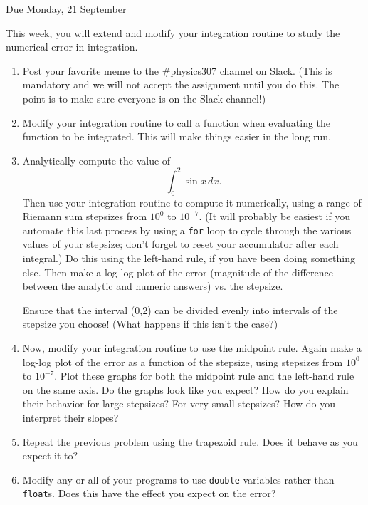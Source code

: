 \documentclass[12pt]{article}
\begin{document}
\Large
\centerline{}
\centerline{Due Monday, 21 September}
\normalsize

This week, you will extend and modify your integration routine to study the numerical error in integration.
\begin{enumerate}

\item Post your favorite meme to the \#physics307 channel on Slack. (This is mandatory and we will not accept the assignment until you do this. The point is to make sure everyone is on the Slack channel!)

\item{Modify your integration routine to call a function when evaluating the function to be integrated. This will make things easier in the long run.}

\item{Analytically compute the value of $$\int_{0}^{2} \sin x\, dx.$$ Then use your integration routine to compute it numerically, using a range of Riemann sum stepsizes from $10^{0}$
    to $10^{-7}$. (It will probably be easiest if you automate this last process by using a {\tt for} loop to cycle through the various values of your stepsize; don't forget to reset your
  accumulator after each integral.) Do this using the left-hand rule, if you have been doing something else. 
  Then make a log-log plot of the error (magnitude of the difference between the analytic and numeric answers) vs. the stepsize.

Ensure that the interval (0,2) can be divided evenly into intervals of the stepsize you choose! (What happens if this isn't the case?)}

\item{Now, modify your integration routine to use the midpoint rule. Again make a log-log plot of the error as a function of the stepsize, using stepsizes from $10^{0}$ to $10^{-7}$.
    Plot these graphs for both the midpoint rule and the left-hand rule on the same axis. Do the graphs look like you expect? How do you explain their behavior for large stepsizes?
  For very small stepsizes? How do you interpret their slopes?}

\item{Repeat the previous problem using the trapezoid rule. Does it behave as you expect it to?}

\item{Modify any or all of your programs to use {\tt double} variables rather than {\tt float}s. Does this have the effect you expect on the error?}


\end{enumerate}
\end{document}
